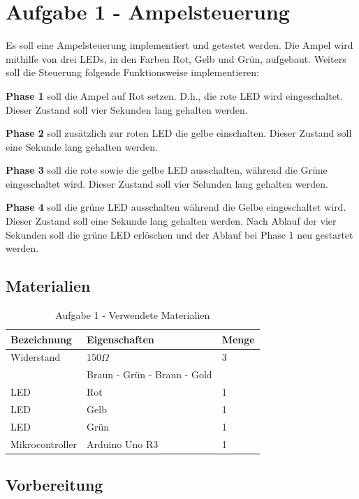 \section{Aufgabe 1 - Ampelsteuerung}
\label{sec:aufgabe-1}

Es soll eine Ampelsteuerung implementiert und getestet werden.
Die Ampel wird mithilfe von drei LEDs, in den Farben Rot, Gelb und Grün, aufgebaut.
Weiters soll die Steuerung folgende Funktionsweise implementieren:

\textbf{Phase 1} soll die Ampel auf Rot setzen.
D.h., die rote LED wird eingeschaltet.
Dieser Zustand soll vier Sekunden lang gehalten werden.

\textbf{Phase 2} soll zusätzlich zur roten LED die gelbe einschalten.
Dieser Zustand soll eine Sekunde lang gehalten werden.

\textbf{Phase 3} soll die rote sowie die gelbe LED ausschalten, während die Grüne eingeschaltet wird.
Dieser Zustand soll vier Selunden lang gehalten werden.

\textbf{Phase 4} soll die grüne LED ausschalten während die Gelbe eingeschaltet wird.
Dieser Zustand soll eine Sekunde lang gehalten werden.
Nach Ablauf der vier Sekunden soll die grüne LED erlöschen und der Ablauf bei Phase 1 neu gestartet werden.

\subsection{Materialien}
\label{subsec:A1-materialien}

\begin{table}[h]
    \centering
    \caption{Aufgabe 1 - Verwendete Materialien}
    \label{tab:a1-materialien}
    \begin{tabular}{| l | l | l |}
        \hline
        Bezeichnung & Eigenschaften & Menge \\
        \hline
        Widerstand  & $150\Omega$   & 3     \\
        & Braun - Grün - Braun - Gold & \\
        LED & Rot & 1 \\
        LED & Gelb & 1 \\
        LED & Grün & 1 \\
        Mikrocontroller & Arduino Uno R3 & 1 \\
        \hline
    \end{tabular}
\end{table}

\subsection{Vorbereitung}
\label{subsec:A1-vorbereitung}

